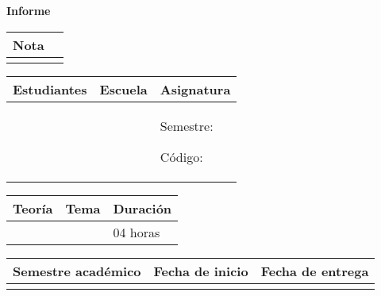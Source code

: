
	
	\vspace*{10pt}
	
	\begin{center}	
		\fontsize{17}{17} \textbf{ Informe \itemPracticeNumber}	
	\end{center}
	\begin{minipage}{\textwidth}
	\cen
	\textbf{\Large \itemTheme}
	\vspace*{0.5cm}
	\end{minipage}

	\begin{flushright}
		\begin{tabular}{|M{2.5cm}|N|}
			\hline 
			\color{white} \textbf{Nota}  \\
			\hline 
			     \\[30pt]
			\hline 			
		\end{tabular}
	\end{flushright}	

	\begin{table}[H]
		\begin{tabular}{|x{5.5cm}|x{4.5cm}|x{4.2cm}|}
			\hline 
			\color{white} \textbf{Estudiantes} & \color{white}\textbf{Escuela}  & \color{white}\textbf{Asignatura}   \\
			\hline 
			{\itemStudent \par \itemEmail} & \itemSchool & {\itemCourse \par Semestre: \itemSemester \par Código: \itemCourseCode}     \\
			\hline 			
		\end{tabular}
	\end{table}		
	
	\begin{table}[H]
		\begin{tabular}{|x{4.7cm}|x{4.8cm}|x{4.8cm}|}
			\hline 
			\color{white}\textbf{Teoría} & \color{white}\textbf{Tema}  & \color{white}\textbf{Duración}   \\
			\hline 
			\itemPracticeNumber & \itemTheme & 04 horas   \\
			\hline 
		\end{tabular}
	\end{table}
	
	\begin{table}[H]
		\begin{tabular}{|x{4.7cm}|x{4.8cm}|x{4.8cm}|}
			\hline 
			\color{white}\textbf{Semestre académico} & \color{white}\textbf{Fecha de inicio}  & \color{white}\textbf{Fecha de entrega}   \\
			\hline 
			\itemAcademic & \itemInput &  \itemOutput  \\
			\hline 
		\end{tabular}
	\end{table}

